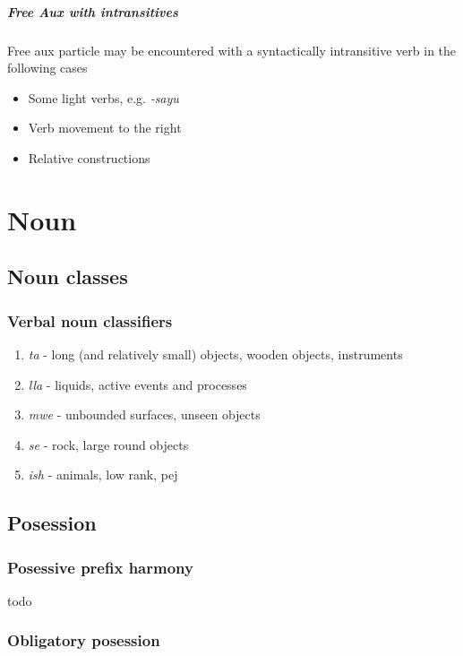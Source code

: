 \documentclass[8pt]{book}
\begin{document}
\paragraph{Free Aux with intransitives}
Free aux particle may be encountered with a syntactically intransitive verb in the following cases

\begin{itemize}
\item Some light verbs, e.g. \textit{-sayu} 
\item Verb movement to the right
\item Relative constructions
\end{itemize}


\chapter{Noun}

\section{Noun classes}
\subsection{Verbal noun classifiers}

\begin{enumerate}
\item \textit{ta} - long (and relatively small) objects, wooden objects, instruments
\item \textit{lla} - liquids, active events and processes
\item \textit{mwe} - unbounded surfaces, unseen objects
\item \textit{se} - rock,  large round objects
\item \textit{ish} - animals, low rank, pej
\end{enumerate}


\section{Posession}

\subsection{Posessive prefix harmony}

todo

\subsection{Obligatory posession}
\end{document}
